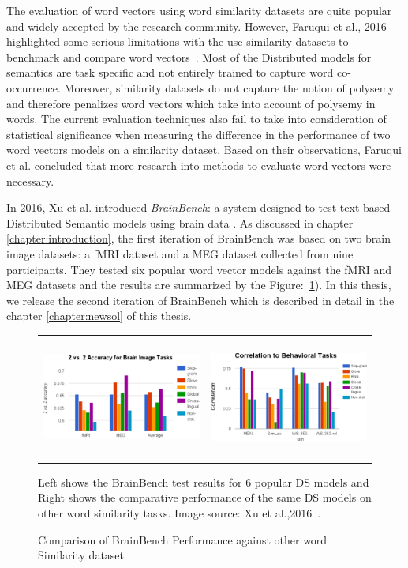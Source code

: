The evaluation of word vectors using word similarity datasets are quite popular and widely accepted by the research community. However, Faruqui et al., 2016 highlighted some serious limitations with the use similarity datasets to benchmark and compare word vectors~\cite{W16-2506}. Most of the Distributed models for semantics are task specific and not entirely trained to capture word co-occurrence. Moreover, similarity datasets do not capture the notion of polysemy and therefore penalizes word vectors which take into account of polysemy in words. The current evaluation techniques also fail to take into consideration of statistical significance when measuring the difference in the performance of two word vectors models on a similarity dataset. Based on their observations, Faruqui et al. concluded that more research into methods to evaluate word vectors were necessary.

In 2016, Xu et al. introduced \textit{BrainBench}: a system designed to test text-based Distributed Semantic models using brain data \cite{BrainBench2016}. As discussed in chapter \ref{chapter:introduction}, the first iteration of BrainBench was based on two brain image datasets: a fMRI dataset \cite{Mitchell1191} and a MEG dataset \cite{SUDRE2012451} collected from nine participants. They tested six popular word vector models against the fMRI and MEG datasets and the results are summarized by the Figure:~\ref{BrainBench11}). In this thesis, we release the second iteration of BrainBench which is described in detail in the chapter \ref{chapter:newsol} of this thesis.

\begin{figure}[t]
\begin{tabular}{ll}
\includegraphics[width =7cm,height=4cm]{Figures/brainbench}
&
\includegraphics[width =7cm,height=4cm]{Figures/brainbench2}
\end{tabular}
\caption{Comparison of BrainBench Performance against other word Similarity dataset}
\label{BrainBench11}
Left shows the BrainBench test results for 6 popular DS models and Right shows the comparative performance of the same DS models on other word similarity tasks. Image source: Xu et al.,2016~\cite{BrainBench2016}.
\end{figure}


